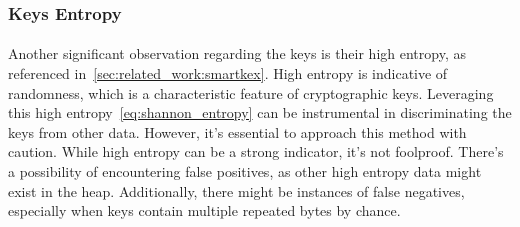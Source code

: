         \subsubsection{Keys Entropy}
    
            \paragraph{}Another significant observation regarding the keys is their high entropy, as referenced in~\ref{sec:related_work:smartkex}. High entropy is indicative of randomness, which is a characteristic feature of cryptographic keys. Leveraging this high entropy~\ref{eq:shannon_entropy} can be instrumental in discriminating the keys from other data. However, it's essential to approach this method with caution. While high entropy can be a strong indicator, it's not foolproof. There's a possibility of encountering false positives, as other high entropy data might exist in the heap. Additionally, there might be instances of false negatives, especially when keys contain multiple repeated bytes by chance.
    
